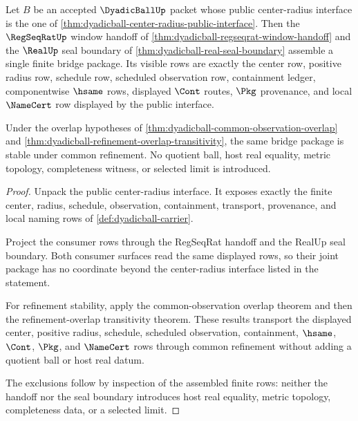 \begin{theorem}
\label{thm:dyadicball-public-bridge-package}
Let $B$ be an accepted $\DyadicBallUp$ packet whose public center-radius
interface is the one of
\autoref{thm:dyadicball-center-radius-public-interface}. Then the
$\RegSeqRatUp$ window handoff of
\autoref{thm:dyadicball-regseqrat-window-handoff} and the $\RealUp$ seal
boundary of \autoref{thm:dyadicball-real-seal-boundary} assemble a single
finite bridge package. Its visible rows are exactly the center row, positive
radius row, schedule row, scheduled observation row, containment ledger,
componentwise $\hsame$ rows, displayed $\Cont$ routes, $\Pkg$ provenance, and
local $\NameCert$ row displayed by the public interface.

Under the overlap hypotheses of
\autoref{thm:dyadicball-common-observation-overlap} and
\autoref{thm:dyadicball-refinement-overlap-transitivity}, the same bridge
package is stable under common refinement. No quotient ball, host real
equality, metric topology, completeness witness, or selected limit is
introduced.
\end{theorem}
\begin{proof}
Unpack the public center-radius interface. It exposes exactly the finite
center, radius, schedule, observation, containment, transport, provenance, and
local naming rows of \autoref{def:dyadicball-carrier}.

Project the consumer rows through the RegSeqRat handoff and the RealUp seal
boundary. Both consumer surfaces read the same displayed rows, so their joint
package has no coordinate beyond the center-radius interface listed in the
statement.

For refinement stability, apply the common-observation overlap theorem and then
the refinement-overlap transitivity theorem. These results transport the
displayed center, positive radius, schedule, scheduled observation,
containment, $\hsame$, $\Cont$, $\Pkg$, and $\NameCert$ rows through common
refinement without adding a quotient ball or host real datum.

The exclusions follow by inspection of the assembled finite rows: neither the
handoff nor the seal boundary introduces host real equality, metric topology,
completeness data, or a selected limit.
\end{proof}

